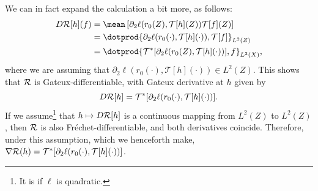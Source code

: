 We can in fact expand the calculation a bit more, as follows:
\begin{align*}
    D \risk [ h ] ( f )
    &= \mean \left[
        \partial_{ 2 } \ell ( r_{ 0 } ( Z ), \mathcal{T} [ h ] ( Z ) ) \mathcal{T} [ f ] ( Z )
    \right] \\
    &= \dotprod{ \partial_{ 2 } \ell ( r_{ 0 } ( \cdot ), \mathcal{T} [ h ] ( \cdot ) ), \mathcal{T} [ f ] }_{ L^{ 2 } ( Z ) } \\
    &= \dotprod{ \mathcal{T}^{ * } [ \partial_{ 2 } \ell ( r_{ 0 } ( Z ), \mathcal{T} [ h ] ( \cdot ) ) ], f }_{ L^{ 2 } ( X ) }
,\end{align*}
where we are assuming that $ \partial_{ 2 } \ell ( r_{ 0 } ( \cdot ), \mathcal{T} [ h ] ( \cdot ) ) \in L^{ 2 } ( Z ) $.
This shows that $ \mathcal{R} $ is Gateux-differentiable, with Gateux derivative at $ h $ given by
\begin{equation*}
    D \mathcal{R} [ h ] = \mathcal{T}^{ * } [ \partial_{ 2 } \ell ( r_{ 0 } ( \cdot ), \mathcal{T} [ h ] ( \cdot ) ) ]
.\end{equation*}
If we assume\footnote{It is if $ \ell $ is quadratic.} that $ h \mapsto D \mathcal{R} [ h ] $ is a continuous mapping from $ L^{ 2 } ( Z ) $ to $ L^{ 2 } ( Z ) $, then $ \mathcal{R} $ is also Fréchet-differentiable, and both derivatives coincide.
Therefore, under this assumption, which we henceforth make, $ \nabla \mathcal{R} ( h ) = \mathcal{T}^{ * } [ \partial_{ 2 } \ell ( r_{ 0 } ( \cdot ), \mathcal{T} [ h ] ( \cdot ) ) ] $.
